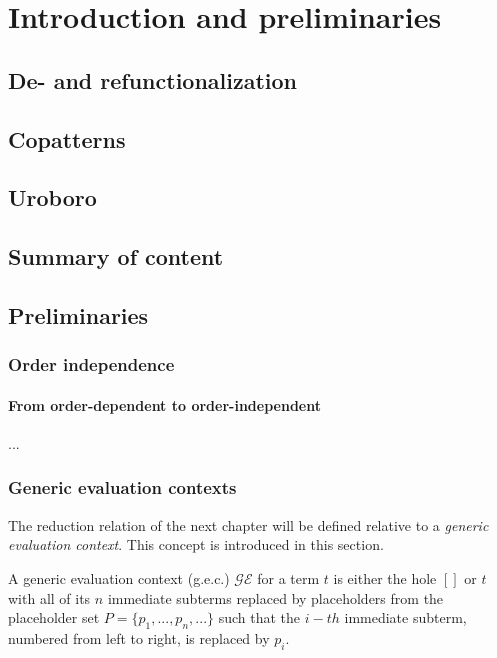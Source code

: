 \chapter{Introduction and preliminaries}

\section{De- and refunctionalization}

\section{Copatterns}

\section{Uroboro}

\section{Summary of content}

\section{Preliminaries}

\subsection{Order independence}

\subsubsection{From order-dependent to order-independent}

...

\subsection{Generic evaluation contexts}

The reduction relation of the next chapter will be defined relative to a \textit{generic evaluation context}. This concept is introduced in this section.

\begin{definition}
A generic evaluation context (g.e.c.) $\mathcal{GE}$ for a term $t$ is either the hole $[]$ or $t$ with all of its $n$ immediate subterms replaced by placeholders from the placeholder set $P = \{p_1, ..., p_n, ...\}$ such that the $i-th$ immediate subterm, numbered from left to right, is replaced by $p_i$.
\end{definition}

